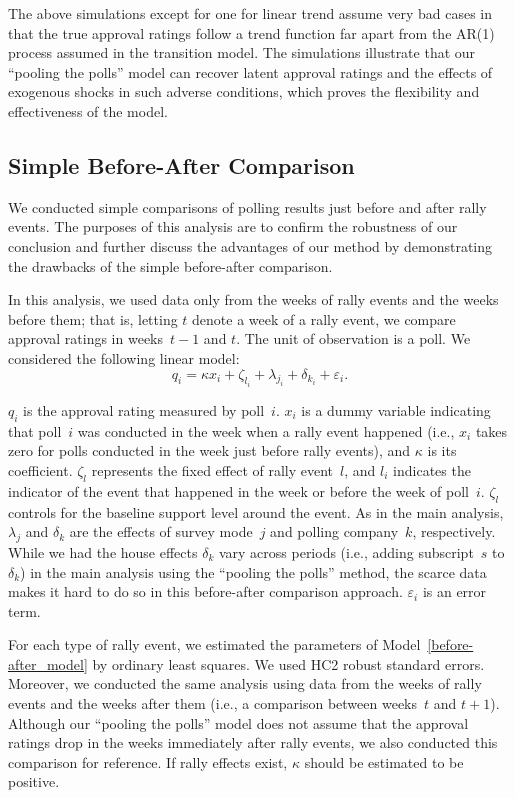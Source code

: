 \documentclass[12pt,letterpaper]{scrartcl}
\begin{document}
The above simulations except for one for linear trend assume very bad cases in that the true approval ratings follow a trend function far apart from the AR(1) process assumed in the transition model. The simulations illustrate that our ``pooling the polls'' model can recover latent approval ratings and the effects of exogenous shocks in such adverse conditions, which proves the flexibility and effectiveness of the model.

\subsection{Simple Before-After Comparison}\label{app:subsec:before-after}

We conducted simple comparisons of polling results just before and after rally events. The purposes of this analysis are to confirm the robustness of our conclusion and further discuss the advantages of our method by demonstrating the drawbacks of the simple before-after comparison.

In this analysis, we used data only from the weeks of rally events and the weeks before them; that is, letting $t$ denote a week of a rally event, we compare approval ratings in weeks~$t-1$ and $t$. The unit of observation is a poll. We considered the following linear model:
\begin{equation}
q_{i}=\kappa x_{i}+\zeta _{l_{i}}+\lambda _{j_{i}}+\delta _{k_{i}}+\varepsilon _{i}.\label{before-after_model}
\end{equation}

$q_{i}$ is the approval rating measured by poll~$i$. $x_{i}$ is a dummy variable indicating that poll~$i$ was conducted in the week when a rally event happened (i.e., $x_{i}$ takes zero for polls conducted in the week just before rally events), and $\kappa $ is its coefficient. $\zeta _{l}$ represents the fixed effect of rally event~$l$, and $l_{i}$ indicates the indicator of the event that happened in the week or before the week of poll~$i$. $\zeta _{l}$ controls for the baseline support level around the event. As in the main analysis, $\lambda _{j}$ and $\delta _{k}$ are the effects of survey mode~$j$ and polling company~$k$, respectively. While we had the house effects $\delta _{k}$ vary across periods (i.e., adding subscript~$s$ to $\delta _{k}$) in the main analysis using the ``pooling the polls'' method, the scarce data makes it hard to do so in this before-after comparison approach. $\varepsilon _{i}$ is an error term.

For each type of rally event, we estimated the parameters of Model~\eqref{before-after_model} by ordinary least squares. We used HC2 robust standard errors. Moreover, we conducted the same analysis using data from the weeks of rally events and the weeks after them (i.e., a comparison between weeks~$t$ and $t+1$). Although our ``pooling the polls'' model does not assume that the approval ratings drop in the weeks immediately after rally events, we also conducted this comparison for reference. If rally effects exist, $\kappa $ should be estimated to be positive.
\end{document}
